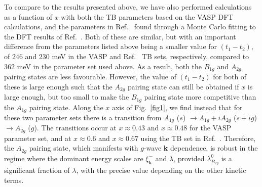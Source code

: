 \documentclass[%
reprint,
superscriptaddress,
 amsmath,amssymb,
 aps,
prb,
nobalancelastpage,
]{revtex4-2}
\begin{document}








To compare to the results presented above, we have also performed calculations as a function of $x$ with both the TB parameters based on the VASP DFT calculations, and the parameters in Ref.~\cite{Roising2019prr} found through a Monte Carlo fitting to the DFT results of Ref.~\cite{Veenstra2014PRL}. Both of these are similar, but with an important difference from the parameters listed above being a smaller value for $(t_{1}-t_{2})$, of $246$ and $230$ meV in the VASP and Ref.~\cite{Roising2019prr} TB sets, respectively, compared to $362$ meV in the parameter set used above. As a result, both the $B_{1g}$ and $A_{2g}$ pairing states are less favourable. However, the value of $(t_{1}-t_{2})$ for both of these is large enough such that the $A_{2g}$ pairing state can still be obtained if $x$ is large enough, but too small to make the $B_{1g}$ pairing state more competitive than the $A_{1g}$ pairing state. Along the $x$ axis of Fig.~\ref{fig1}, we find instead that for these two parameter sets there is a transition from $A_{1g}$ ($s$) $\rightarrow A_{1g}+iA_{2g}$ ($s+ig$) $\rightarrow A_{2g}$ ($g$). The transitions occur at $x\approx 0.43$ and $x\approx0.48$ for the VASP parameter set, and at $x\approx 0.6$ and $x\approx0.67$ using the TB set in Ref.~\cite{Roising2019prr}. Therefore, the $A_{2g}$ pairing state, which manifests with $g$-wave \textbf{k} dependence, is robust in the regime where the dominant energy scales are $\xi_{\textbf{k}}^{-}$ and $\lambda$, provided $\lambda_{B_{2g}}^{0}$ is a significant fraction of $\lambda$, with the precise value depending on the other kinetic terms.
 
\end{document}
